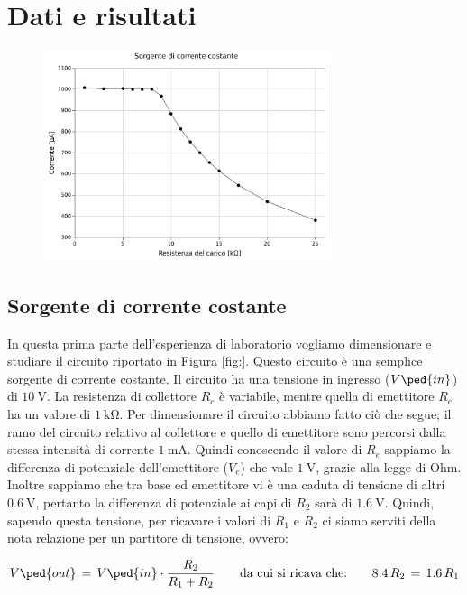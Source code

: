 \section*{Dati e risultati}

\begin{figure}
	\centering
	\includegraphics[width=0.75\textwidth]{current.pdf}
	\caption{}
	\label{fig:curr}
\end{figure}

\subsection*{Sorgente di corrente costante}

In questa prima parte dell'esperienza di laboratorio vogliamo dimensionare e studiare il circuito riportato in Figura \ref{fig:}. Questo circuito è una semplice sorgente di corrente costante. Il circuito ha una tensione in ingresso ($V\ped{in}$) di $\SI{10}{\volt}$. La resistenza di collettore $R_c$ è variabile, mentre quella di emettitore $R_e$ ha un valore di $\SI{1}{\kilo\ohm}$.
Per dimensionare il circuito abbiamo fatto ciò che segue; il ramo del circuito relativo al collettore e quello di emettitore sono percorsi dalla stessa intensità di corrente $\SI{1}{\milli\ampere}$. Quindi conoscendo il valore di $R_e$ sappiamo la differenza di potenziale dell'emettitore ($V_e$) che vale $\SI{1}{\volt}$, grazie alla legge di Ohm. Inoltre sappiamo che tra base ed emettitore vi è una caduta di tensione di altri $\SI{0.6}{\volt}$, pertanto la differenza di potenziale ai capi di $R_2$ sarà di $\SI{1.6}{\volt}$.
Quindi, sapendo questa tensione, per ricavare i valori di $R_1$ e $R_2$ ci siamo serviti della nota relazione per un partitore di tensione, ovvero:

\begin{equation}
	V\ped{out} \,=\, V\ped{in}\cdot\frac{R_2}{R_1+R_2} \qquad\text{da cui si ricava che:}\qquad 8.4\,R_2\,=\,1.6\,R_1
\end{equation}

